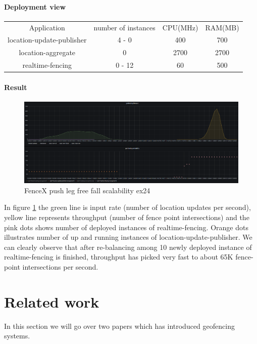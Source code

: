\documentclass[a4]{report}
\begin{document}
    \paragraph{Deployment view}
    \begin{center}
        \begin{tabular}{ c c c c }
            Application               & number of instances & CPU(MHz) & RAM(MB) \\
            location-update-publisher & 4 - 0               & 400      & 700     \\
            location-aggregate        & 0                   & 2700     & 2700    \\
            realtime-fencing          & 0 - 12              & 60       & 500     \\
        \end{tabular}
    \end{center}

    \paragraph{Result}
    \begin{figure}[ht]
        \caption{FenceX push leg free fall scalability ex24}
        \label{fig:ex24}
        \includegraphics[scale=0.4]{images/evaluation/ex24-benchmarking-ongoing-1per2sec.png}
    \end{figure}
    In figure \ref{fig:ex24} the green line is input rate (number of location updates per second),
    yellow line represents throughput (number of fence point intersections) and the pink dots shows number of
    deployed instances of realtime-fencing.
    Orange dots illustrates number of up and running instances of location-update-publisher.
    We can clearly observe that after re-balancing among 10 newly deployed instance of realtime-fencing is finished,
    throughput has picked very fast to about 65K fence-point intersections per second.

    \section{Related work}
    In this section we will go over two papers which has introduced geofencing systems.
\end{document}
